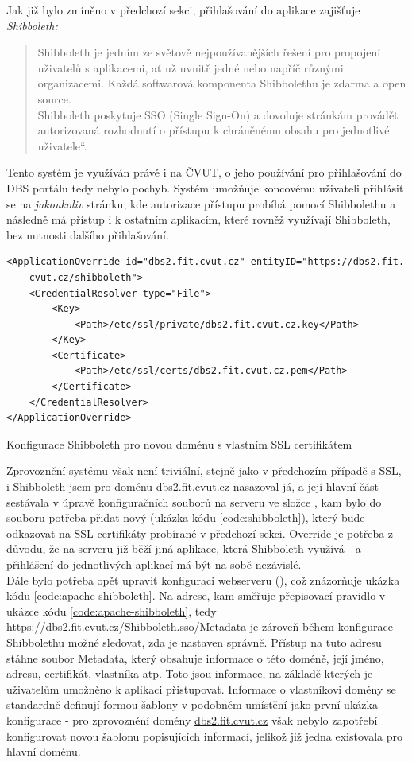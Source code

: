 Jak již bylo zmíněno v předchozí sekci, přihlašování do aplikace zajišťuje \emph{Shibboleth:}
\begin{quote}
\quotedblbase Shibboleth je jedním ze světově nejpoužívanějších řešení pro propojení uživatelů s aplikacemi, ať už uvnitř jedné nebo napříč různými organizacemi. Každá softwarová komponenta Shibbolethu je zdarma a open source.\\
Shibboleth poskytuje SSO (Single Sign-On) a dovoluje stránkám provádět autorizovaná rozhodnutí o přístupu k chráněnému obsahu pro jednotlivé uživatele\textquotedblleft \cite{shibboleth}.
\end{quote}
Tento systém je využíván právě i na ČVUT, o jeho používání pro přihlašování do DBS portálu tedy nebylo pochyb. Systém umožňuje koncovému uživateli přihlásit se na \emph{jakoukoliv} stránku, kde autorizace přístupu probíhá pomocí Shibbolethu a následně má přístup i k ostatním aplikacím, které rovněž využívají Shibboleth, bez nutnosti dalšího přihlašování.\\
\begin{listing}[H]
	\begin{verbatim}
<ApplicationOverride id="dbs2.fit.cvut.cz" entityID="https://dbs2.fit.
    cvut.cz/shibboleth">
    <CredentialResolver type="File">
        <Key>
            <Path>/etc/ssl/private/dbs2.fit.cvut.cz.key</Path>
        </Key>
        <Certificate>
            <Path>/etc/ssl/certs/dbs2.fit.cvut.cz.pem</Path>
        </Certificate>
    </CredentialResolver>
</ApplicationOverride>
	\end{verbatim}
	\caption{Konfigurace Shibboleth pro novou doménu s vlastním SSL certifikátem} \label{code:shibboleth}
\end{listing}
Zprovoznění systému však není triviální, stejně jako v předchozím případě s SSL, i Shibboleth jsem pro doménu \url{dbs2.fit.cvut.cz} nasazoval já, a její hlavní část sestávala v úpravě konfiguračních souborů na serveru ve složce , kam bylo do souboru  potřeba přidat nový  (ukázka kódu \ref{code:shibboleth}), který bude odkazovat na SSL certifikáty probírané v předchozí sekci. Override je potřeba z důvodu, že na serveru již běží jiná aplikace, která Shibboleth využívá -  a přihlášení do jednotlivých aplikací má být na sobě nezávislé.\\
Dále bylo potřeba opět upravit konfiguraci webserveru (), což znázorňuje ukázka kódu \ref{code:apache-shibboleth}. Na adrese, kam směřuje přepisovací pravidlo v ukázce kódu \ref{code:apache-shibboleth}, tedy \url{https://dbs2.fit.cvut.cz/Shibboleth.sso/Metadata} je zároveň během konfigurace Shibbolethu možné sledovat, zda je nastaven správně. Přístup na tuto adresu stáhne soubor Metadata, který obsahuje informace o této doméně, její jméno, adresu, certifikát, vlastníka atp. Toto jsou informace, na základě kterých je uživatelům umožněno k aplikaci přistupovat. Informace o vlastníkovi domény se standardně definují formou šablony v podobném umístění jako první ukázka konfigurace - pro zprovoznění domény \url{dbs2.fit.cvut.cz} však nebylo zapotřebí konfigurovat novou šablonu popisujících informací, jelikož již jedna existovala pro hlavní doménu.
